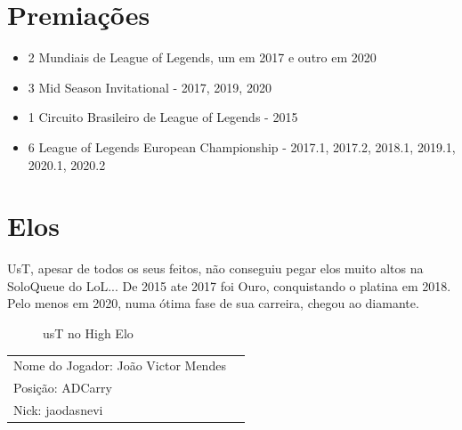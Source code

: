 \begin{multicols}{2}
	\section*{Premiações}
	\begin{itemize}
		\item 2 Mundiais de League of Legends, um em  2017 e outro em 2020
		\item 3 Mid Season Invitational - 2017, 2019, 2020
		\item 1 Circuito Brasileiro de League of Legends - 2015
		\item 6 League of Legends European Championship - 2017.1, 2017.2, 2018.1, 2019.1, 2020.1, 2020.2
	\end{itemize}
	
	\section*{Elos}
	UsT, apesar de todos os seus feitos, não conseguiu pegar elos muito altos na SoloQueue do LoL... De 2015 ate 2017 foi Ouro, conquistando o platina em 2018. Pelo menos em 2020, numa ótima fase de sua carreira, chegou ao diamante\cite{kou}.
	\begin{figure}[H]
		\centering
		\caption{usT no High Elo }
		\label{fig:elos}
	\end{figure}
\end{multicols}

\begin{tabularx}{\linewidth}{@{}m{} m{}@{}}
	\large{Nome do Jogador: João Victor Mendes} \\
	\large{Posição: ADCarry}\\
	\large{Nick: jaodasnevi}
\end{tabularx}

